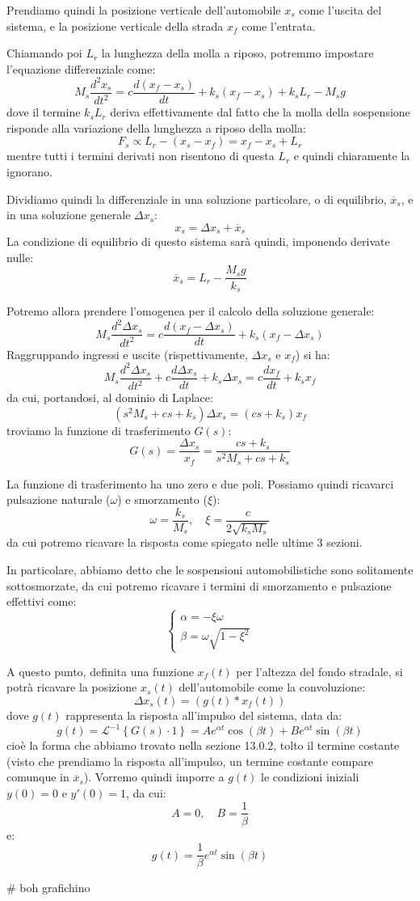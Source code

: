\documentclass[a4paper,11pt]{article}
\begin{document}
\par\medskip

Prendiamo quindi la posizione verticale dell'automobile $x_s$ come l'uscita del sistema, e la posizione verticale della strada $x_f$ come l'entrata.

Chiamando poi $L_r$ la lunghezza della molla a riposo, potremmo impostare l'equazione differenziale come:
$$
M_s \frac{d^2 x_s}{dt^2} = c \frac{d ( x_f - x_s )}{dt} + k_s (x_f - x_s) + k_s L_r - M_s g
$$
dove il termine $k_s L_r$ deriva effettivamente dal fatto che la molla della sospensione risponde alla variazione della lunghezza a riposo della molla:
$$
F_s \propto  L_r - (x_s - x_f) = x_f - x_s + L_r
$$
mentre tutti i termini derivati non risentono di questa $L_r$ e quindi chiaramente la ignorano.

Dividiamo quindi la differenziale in una soluzione particolare, o di equilibrio, $\overline{x}_s$, e in una soluzione generale $\Delta x_s$:
$$
x_s = \Delta x_s + \overline{x}_s
$$
La condizione di equilibrio di questo sistema sarà quindi, imponendo derivate nulle:
$$
\overline{x}_s = L_r - \frac{M_s g}{k_s}
$$

Potremo allora prendere l'omogenea per il calcolo della soluzione generale:
$$
M_s \frac{d^2 \Delta x_s}{dt^2} = c \frac{d ( x_f - \Delta x_s )}{dt} + k_s (x_f - \Delta x_s)
$$
Raggruppando ingressi e uscite (rispettivamente, $\Delta x_s$ e $x_f$) si ha:
$$
M_s \frac{d^2 \Delta x_s}{dt^2} + c \frac{d \Delta x_s}{dt} + k_s \Delta x_s = c \frac{dx_f}{dt} + k_s x_f
$$
da cui, portandosi, al dominio di Laplace:
$$
\left( s^2 M_s + cs + k_s \right) \Delta x_s = ( cs + k_s ) x_f
$$
troviamo la funzione di trasferimento $G(s)$:
$$
G(s) = \frac{\Delta x_s}{x_f} = \frac{c s + k_s}{s^2 M_s + c s + k_s}
$$

La funzione di trasferimento ha uno zero e due poli.
Possiamo quindi ricavarci pulsazione naturale ($\omega$) e smorzamento ($\xi$):
$$
\omega = \frac{k_s}{M_s}, \quad \xi = \frac{c}{2 \sqrt{k_s M_s}}
$$
da cui potremo ricavare la risposta come spiegato nelle ultime 3 sezioni.

In particolare, abbiamo detto che le sospensioni automobilistiche sono solitamente sottosmorzate, da cui potremo ricavare i termini di smorzamento e pulsazione effettivi come:
\[
	\begin{cases}
		\alpha = -\xi \omega\\
		\beta = \omega \sqrt{1 - \xi^2}
	\end{cases}
\]

A questo punto, definita una funzione $x_f(t)$ per l'altezza del fondo stradale, si potrà ricavare la posizione $x_s(t)$ dell'automobile come la convoluzione:
$$
\Delta x_s(t) = ( g(t) * x_f(t) )
$$
dove $g(t)$ rappresenta la risposta all'impulso del sistema, data da:
$$
g(t) = \mathcal{L}^{-1} \left\{ G(s) \cdot 1 \right\} = A e^{\alpha t} \cos(\beta t) + B e^{\alpha t} \sin(\beta t)
$$
cioè la forma che abbiamo trovato nella sezione 13.0.2, tolto il termine costante (visto che prendiamo la risposta all'impulso, un termine costante compare comunque in $\overline{x}_s$).
Vorremo quindi imporre a $g(t)$ le condizioni iniziali $y(0) = 0$ e $y'(0) = 1$, da cui:
$$
A = 0, \quad B = \frac{1}{\beta}
$$
e: 
$$
g(t) = \frac{1}{\beta} e^{\alpha t} \sin(\beta t)
$$

# boh grafichino
\end{document}
